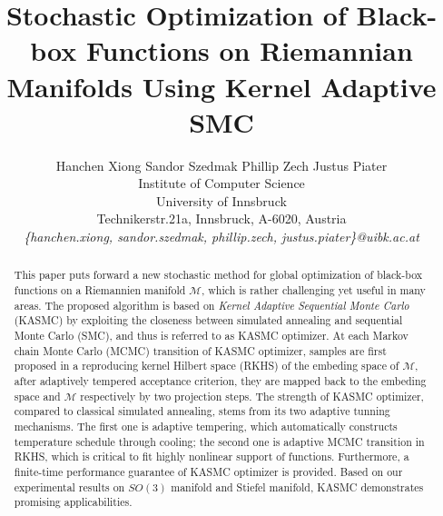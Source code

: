 \documentclass{article} %
\title{Stochastic Optimization of Black-box Functions on Riemannian Manifolds Using Kernel Adaptive SMC}
\author{
Hanchen Xiong \quad Sandor Szedmak \quad Phillip Zech \quad Justus Piater 
\\
Institute of Computer Science \\
University of Innsbruck\\
Technikerstr.21a, Innsbruck, A-6020, Austria \\
\textit{\{hanchen.xiong, sandor.szedmak, phillip.zech, justus.piater\}@uibk.ac.at} \\
}
\begin{document}
\maketitle

\begin{abstract}
This paper puts forward a new stochastic method for global optimization of black-box functions on a Riemannien manifold $\mathcal{M}$,   
which is rather challenging yet useful in many areas. The proposed algorithm is based on \emph{Kernel Adaptive Sequential 
Monte Carlo} (KASMC) by exploiting the closeness between simulated annealing and sequential Monte Carlo (SMC), and thus is referred to as KASMC optimizer.             
At each Markov chain Monte Carlo (MCMC) transition of KASMC optimizer, samples are first proposed in a reproducing kernel Hilbert space (RKHS) of the embeding space 
of $\mathcal{M}$, after adaptively tempered acceptance criterion, they are mapped back to the embeding space and $\mathcal{M}$ respectively by two projection steps.     
The strength of KASMC optimizer, compared to classical simulated annealing, stems from its two adaptive  
tunning mechanisms. The first one is adaptive tempering, which automatically constructs temperature schedule through cooling; 
the second one is adaptive MCMC transition in RKHS, which is 
critical to fit highly nonlinear support of functions. 
Furthermore, a finite-time performance guarantee of KASMC optimizer is provided.   
Based on our experimental results on $SO(3)$ manifold and Stiefel manifold, KASMC demonstrates promising applicabilities.     
\end{abstract}
\end{document}
